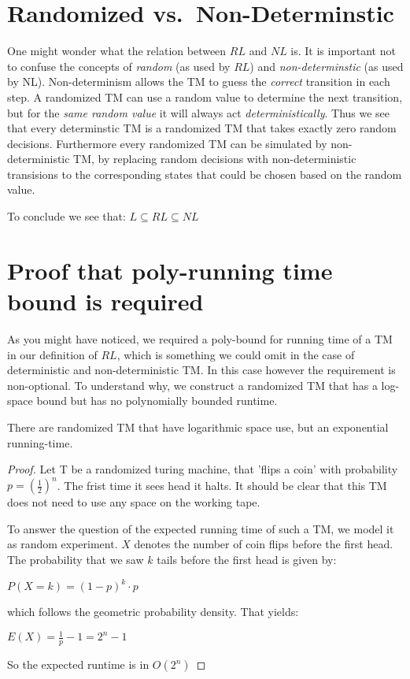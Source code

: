 \section{Randomized
vs.~Non-Determinstic}\label{randomized-vs.non-determinstic}

One might wonder what the relation between $RL$ and $NL$ is. It is
important not to confuse the concepts of \emph{random} (as used by $RL$)
and \emph{non-determinstic} (as used by NL). Non-determinism allows the
TM to guess the \emph{correct} transition in each step. A randomized TM
can use a random value to determine the next transition, but for the
\emph{same random value} it will always act \emph{deterministically}.
Thus we see that every determinstic TM is a randomized TM that takes
exactly zero random decisions. Furthermore every randomized TM can be
simulated by non-deterministic TM, by replacing random decisions with
non-deterministic transisions to the corresponding states that could be
chosen based on the random value.

To conclude we see that: $L \subseteq RL \subseteq NL$

\section{Proof that poly-running time bound is
required}\label{proof-that-poly-running-time-bound-is-required}

As you might have noticed, we required a poly-bound for running time of
a TM in our definition of $RL$, which is something we could omit in the
case of deterministic and non-deterministic TM. In this case however the
requirement is non-optional. To understand why, we construct a
randomized TM that has a log-space bound but has no polynomially bounded
runtime.

\vspace{0.5cm}

\begin{thm}
\label{randomized-poly-runtime}
There are randomized TM that have logarithmic space use, but an exponential running-time.
\end{thm}

\begin{proof}
Let T be a randomized turing machine, that 'flips a coin' with probability $p = {\left(\frac{1}{2}\right)}^n$.
The frist time it sees head it halts. It should be clear that this TM does not need to use any space on the working tape.

To answer the question of the expected running time of such a TM, we model it as random experiment.
$X$ denotes the number of coin flips before the first head. The probability that we saw $k$ tails before the first head is given by:

$P(X = k) = (1-p)^k \cdot p$

which follows the geometric probability density. That yields:

$E(X) = \frac{1}{p} - 1 = 2^n - 1$

So the expected runtime is in $O(2^n)$
\end{proof}

